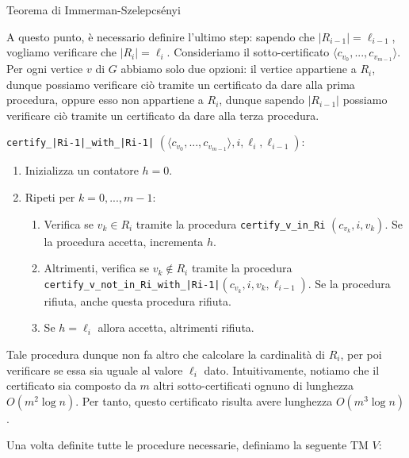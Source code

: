 \begin{Thm}{Teorema di Immerman-Szelepcsényi}{}
\begin{demonstration}
A questo punto, è necessario definire l’ultimo step: sapendo che $|R_{i-1}| = \ell_{i-1}$, vogliamo verificare che $|R_i| = \ell_i$. Consideriamo il sotto-certificato 
$\langle c_{v_0},...,c_{v_{m-1}}\rangle$. Per ogni vertice $v$ di $G$ abbiamo solo due opzioni: il vertice appartiene a $R_i$, dunque possiamo verificare ciò tramite un certificato da dare alla prima procedura, oppure esso non appartiene a $R_i$, dunque sapendo $|R_{i-1}|$ possiamo verificare ciò tramite un certificato da dare alla terza procedura.

\texttt{certify\_|Ri-1|\_with\_|Ri-1|} $(\langle c_{v_0},...,c_{v_{m-1}}\rangle, i, \ell_i, \ell_{i-1})$:
\begin{enumerate}
    \item Inizializza un contatore $h = 0$.
    \item Ripeti per $k = 0, . . . , m-1$:
    \begin{enumerate}
        \item Verifica se $v_k\in R_i$ tramite la procedura \texttt{certify\_v\_in\_Ri} $(c_{v_k}, i, v_k)$. Se la procedura accetta, incrementa $h$.
        \item Altrimenti, verifica se $v_k\notin R_i$ tramite la procedura \texttt{certify\_v\_not\_in\_Ri\_with\_|Ri-1|}$(c_{v_k}, i, v_k, \ell_{i-1})$. Se la procedura rifiuta, anche questa procedura rifiuta.
        \item Se $h = \ell_i$ allora accetta, altrimenti rifiuta.
    \end{enumerate}
\end{enumerate}
Tale procedura dunque non fa altro che calcolare la cardinalità di $R_i$, per poi verificare se essa sia uguale al valore $\ell_i$ dato. Intuitivamente, notiamo che il certificato sia composto da $m$ altri sotto-certificati ognuno di lunghezza $O(m^2\log n)$. Per tanto, questo certificato risulta avere lunghezza $O(m^3\log n)$.

Una volta definite tutte le procedure necessarie, definiamo la seguente TM $V$:


\end{demonstration}
\end{Thm}
